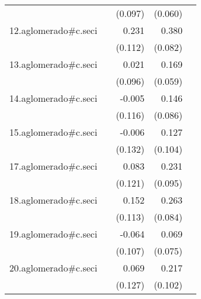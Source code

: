 {\begin{longtable}{l*{4}{D{.}{.}{-1}}}
            &                     &     (0.097)         &     (0.060)         &                     \\
\addlinespace
12.aglomerado#c.seci&                     &       0.231\sym{*}  &       0.380\sym{***}&                     \\
            &                     &     (0.112)         &     (0.082)         &                     \\
\addlinespace
13.aglomerado#c.seci&                     &       0.021         &       0.169\sym{**} &                     \\
            &                     &     (0.096)         &     (0.059)         &                     \\
\addlinespace
14.aglomerado#c.seci&                     &      -0.005         &       0.146         &                     \\
            &                     &     (0.116)         &     (0.086)         &                     \\
\addlinespace
15.aglomerado#c.seci&                     &      -0.006         &       0.127         &                     \\
            &                     &     (0.132)         &     (0.104)         &                     \\
\addlinespace
17.aglomerado#c.seci&                     &       0.083         &       0.231\sym{*}  &                     \\
            &                     &     (0.121)         &     (0.095)         &                     \\
\addlinespace
18.aglomerado#c.seci&                     &       0.152         &       0.263\sym{**} &                     \\
            &                     &     (0.113)         &     (0.084)         &                     \\
\addlinespace
19.aglomerado#c.seci&                     &      -0.064         &       0.069         &                     \\
            &                     &     (0.107)         &     (0.075)         &                     \\
\addlinespace
20.aglomerado#c.seci&                     &       0.069         &       0.217\sym{*}  &                     \\
            &                     &     (0.127)         &     (0.102)         &                     \\

\end{longtable}}
